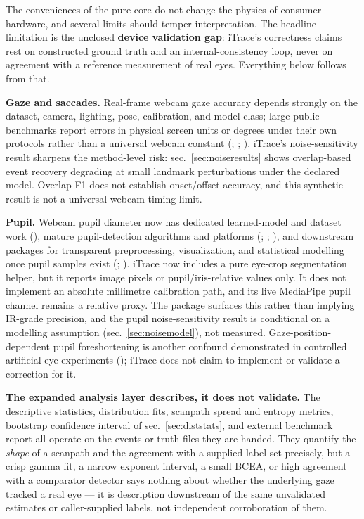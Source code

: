 \documentclass[
]{article}
\begin{document}
The conveniences of the pure core do not change the physics of consumer
hardware, and several limits should temper interpretation. The headline
limitation is the unclosed \textbf{device validation gap}: iTrace's
correctness claims rest on constructed ground truth and an
internal-consistency loop, never on agreement with a reference
measurement of real eyes. Everything below follows from that.

\textbf{Gaze and saccades.} Real-frame webcam gaze accuracy depends
strongly on the dataset, camera, lighting, pose, calibration, and model
class; large public benchmarks report errors in physical screen units or
degrees under their own protocols rather than a universal webcam
constant (;
;
). iTrace's
noise-sensitivity result sharpens the method-level risk:
sec.~\ref{sec:noiseresults} shows overlap-based event recovery degrading
at small landmark perturbations under the declared model. Overlap F1
does not establish onset/offset accuracy, and this synthetic result is
not a universal webcam timing limit.

\textbf{Pupil.} Webcam pupil diameter now has dedicated learned-model
and dataset work (),
mature pupil-detection algorithms and platforms
(;
;
), and downstream
packages for transparent preprocessing, visualization, and statistical
modelling once pupil samples exist
(;
). iTrace now
includes a pure eye-crop segmentation helper, but it reports image
pixels or pupil/iris-relative values only. It does not implement an
absolute millimetre calibration path, and its live MediaPipe pupil
channel remains a relative proxy. The package surfaces this rather than
implying IR-grade precision, and the pupil noise-sensitivity result is
conditional on a modelling assumption (sec.~\ref{sec:noisemodel}), not
measured. Gaze-position-dependent pupil foreshortening is another
confound demonstrated in controlled artificial-eye experiments
(); iTrace does
not claim to implement or validate a correction for it.

\textbf{The expanded analysis layer describes, it does not validate.}
The descriptive statistics, distribution fits, scanpath spread and
entropy metrics, bootstrap confidence interval of
sec.~\ref{sec:diststats}, and external benchmark report all operate on
the events or truth files they are handed. They quantify the
\emph{shape} of a scanpath and the agreement with a supplied label set
precisely, but a crisp gamma fit, a narrow exponent interval, a small
BCEA, or high agreement with a comparator detector says nothing about
whether the underlying gaze tracked a real eye --- it is description
downstream of the same unvalidated estimates or caller-supplied labels,
not independent corroboration of them.
\end{document}
